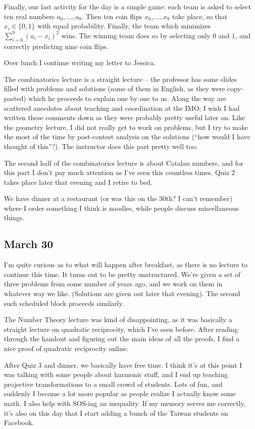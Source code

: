 \documentclass[11pt]{scrreprt}
\begin{document}
Finally, our last activity for the day is a simple game:
each team is asked to select ten real numbers $a_0, \dots, a_9$.
Then ten coin flips $x_0, \dots, x_9$ take place, so that $x_i \in \{0,1\}$ with equal probability.
Finally, the team which minimizes $\sum_{i=0}^9 \left( a_i-x_i \right)^2$ wins.
The winning team does so by selecting only $0$ and $1$, and correctly predicting nine coin flips.

Over lunch I continue writing my letter to Jessica.

The combinatorics lecture is a straight lecture -- the professor has some slides
filled with problems and solutions (some of them in English,
as they were copy-pasted) which he proceeds to explain one by one to us.
Along the way are scattered anecdotes about teaching and coordination at the IMO;
I wish I had written these comments down as they were probably pretty useful later on.
Like the geometry lecture, I did not really get to work on problems,
but I try to make the most of the time by post-contest analysis on the solutions
(``how would I have thought of this''?). The instructor does this part pretty well too.

The second half of the combinatorics lecture is about Catalan numbers,
and for this part I don't pay much attention as I've seen this countless times.
Quiz 2 takes place later that evening and I retire to bed.

We have dinner at a restaurant (or was this on the 30th?
I can't remember) where I order something I think is noodles, while people discuss miscellaneous things.


\subsection{March 30}
I'm quite curious as to what will happen after breakfast, as there is no lecture to continue this time.
It turns out to be pretty unstructured.
We're given a set of three problems from some number of years ago,
and we work on them in whatever way we like. (Solutions are given out later that evening).
The second such scheduled block proceeds similarly.

The Number Theory lecture was kind of disappointing,
as it was basically a straight lecture on quadratic reciprocity, which I've seen before.
After reading through the handout and figuring out the main ideas of all the proofs,
I find a nice proof of quadratic reciprocity online.

After Quiz 3 and dinner, we basically have free time.
I think it's at this point I was talking with some people about harmonic stuff,
and I end up teaching projective transformations to a small crowd of students.
Lots of fun, and suddenly I become a lot more popular as people realize I actually know some math.
I also help with SOS-ing an inequality.
If my memory serves me correctly,
it's also on this day that I start adding a bunch of the Taiwan students on Facebook.
\end{document}
